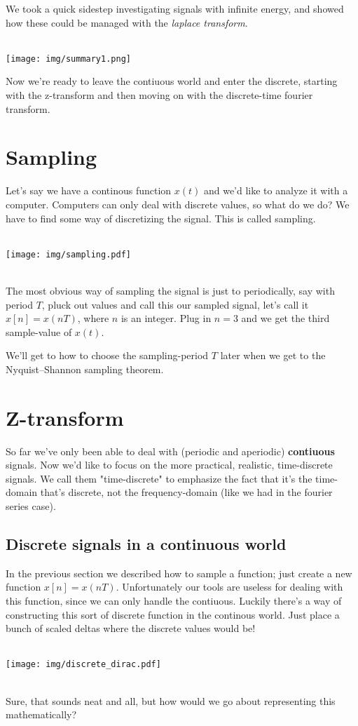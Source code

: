 \documentclass{article}
\newcommand{\0}{{\mathbf{0}}}
\begin{document}
We took a quick sidestep investigating signals with infinite energy, and showed how these could be managed with
the \textit{laplace transform}.
\\\\
\centerline{
  \texttt{[image: img/summary1.png]}
}
Now we're ready to leave the contiuous world and enter the discrete, starting with the z-transform and then moving on
with the discrete-time fourier transform.


\section{Sampling}
Let's say we have a continous function $x(t)$ and we'd like to analyze it with a computer.
Computers can only deal with discrete values, so what do we do? We have to find some
way of discretizing the signal. This is called sampling.
\\\\
\centerline{
  \texttt{[image: img/sampling.pdf]}
}
\\
The most obvious way of sampling the signal is just to periodically, say with period $T$,
pluck out values and call this our sampled signal, let's call it $x[n] = x(nT)$,
where $n$ is an integer. Plug in $n=3$ and we get the third sample-value of $x(t)$.

We'll get to how to choose the sampling-period $T$ later when we get to the Nyquist–Shannon sampling theorem.


\clearpage
\section{Z-transform}
So far we've only been able to deal with (periodic and aperiodic) \textbf{contiuous} signals. Now we'd like to focus on the more
practical, realistic, time-discrete signals. We call them "time-discrete" to emphasize the fact that it's the time-domain
that's discrete, not the frequency-domain (like we had in the fourier series case).

\subsection{Discrete signals in a continuous world}
In the previous section we described how to sample a function; just create a new function $x[n] = x(nT)$. Unfortunately
our tools are useless for dealing with this function, since we can only handle the contiuous. Luckily there's a way
of constructing this sort of discrete function in the continous world. Just place a bunch of scaled deltas where the discrete values would be!
\\\\
\centerline{
  \texttt{[image: img/discrete\_dirac.pdf]}
}
\\
Sure, that sounds neat and all, but how would we go about representing this mathematically?
\end{document}
